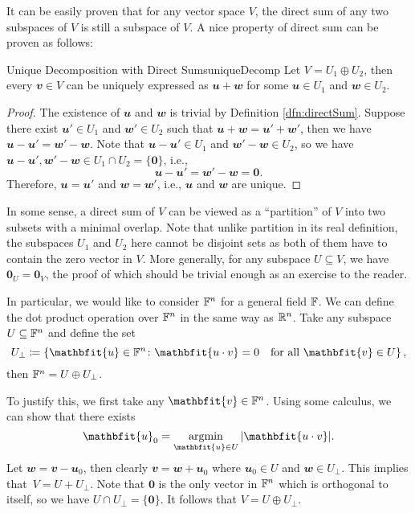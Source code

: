 \documentclass[math, code]{amznotes}
\theoremstyle{remark}
\newcommand{\zero}{\mathbf{0}}
\DeclareMathOperator*{\argmin}{argmin}
\begin{document}
It can be easily proven that for any vector space $V$, the direct sum of any two subspaces of $V$ is still a subspace of $V$. A nice property of direct sum can be proven as follows:
\begin{probox}{Unique Decomposition with Direct Sums}{uniqueDecomp}
    Let $V = U_1 \oplus U_2$, then every $\mathbfit{v} \in V$ can be uniquely expressed as $\mathbfit{u + w}$ for some $\mathbfit{u} \in U_1$ and $\mathbfit{w} \in U_2$.
    \tcblower
    \begin{proof}
        The existence of $\mathbfit{u}$ and $\mathbfit{w}$ is trivial by Definition \ref{dfn:directSum}. Suppose there exist $\mathbfit{u}' \in U_1$ and $\mathbfit{w}' \in U_2$ such that $\mathbfit{u + w} = \mathbfit{u}' + \mathbfit{w}'$, then we have $\mathbfit{u - u}' = \mathbfit{w}' - \mathbfit{w}$. Note that $\mathbfit{u - u}' \in U_1$ and $\mathbfit{w}' - \mathbfit{w} \in U_2$, so we have $\mathbfit{u - u}', \mathbfit{w}' - \mathbfit{w} \in U_1 \cap U_2 = \{\zero\}$, i.e.,
        \begin{equation*}
            \mathbfit{u - u}' = \mathbfit{w}' - \mathbfit{w} = \zero.
        \end{equation*} 
        Therefore, $\mathbfit{u} = \mathbfit{u}'$ and $\mathbfit{w} = \mathbfit{w}'$, i.e., $\mathbfit{u}$ and $\mathbfit{w}$ are unique.
    \end{proof}
\end{probox}
In some sense, a direct sum of $V$ can be viewed as a ``partition'' of $V$ into two subsets with a minimal overlap. Note that unlike partition in its real definition, the subspaces $U_1$ and $U_2$ here cannot be disjoint sets as both of them have to contain the zero vector in $V$. More generally, for any subspace $U \subseteq V$, we have $\zero_U = \zero_V$, the proof of which should be trivial enough as an exercise to the reader.

In particular, we would like to consider $\mathbb{F}^n$ for a general field $\mathbb{F}$. We can define the dot product operation over $\mathbb{F}^n$ in the same way as $\mathbb{R}^n$. Take any subspace $U \subseteq \mathbb{F}^n$ and define the set
\begin{equation*}
    U_{\perp} \coloneqq \left\{\mathbfit{u} \in \F^n \colon \mathbfit{u \cdot v} = 0 \quad\textrm{for all } \mathbfit{v} \in U\right\},
\end{equation*}
then $\mathbb{F}^n = U \oplus U_{\perp}$.

To justify this, we first take any $\mathbfit{v} \in \F^n$. Using some calculus, we can show that there exists 
\begin{equation*}
    \mathbfit{u}_0 = \argmin_{\mathbfit{u} \in U}\abs{\mathbfit{u \cdot v}}.
\end{equation*}
Let $\mathbfit{w = v - u}_0$, then clearly $\mathbfit{v = w + u}_0$ where $\mathbfit{u}_0 \in U$ and $\mathbfit{w} \in U_{\perp}$. This implies that~$V = U + U_{\perp}$. Note that $\zero$ is the only vector in $\mathbb{F}^n$ which is orthogonal to itself, so we have $U \cap U_{\perp} = \{\zero\}$. It follows that $V = U \oplus U_{\perp}$.
\end{document}
